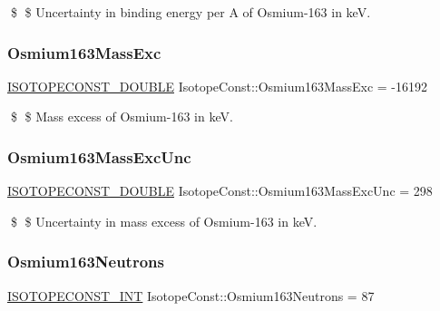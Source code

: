 \$ \$ Uncertainty in binding energy per A of Osmium-\/163 in keV. \mbox{\label{group___isotope_const-_osmium-_os163_ga13b33f42e049f05ee7041526cd588dcc}} 
\subsubsection{\texorpdfstring{Osmium163\+Mass\+Exc}{Osmium163MassExc}}
{\footnotesize\ttfamily \mbox{\hyperlink{group___isotope_const-_macros_ga8f45a7272ce02c0b4c65c44636ed719a}{I\+S\+O\+T\+O\+P\+E\+C\+O\+N\+S\+T\+\_\+\+D\+O\+U\+B\+LE}} Isotope\+Const\+::\+Osmium163\+Mass\+Exc = -\/16192}

\$ \$ Mass excess of Osmium-\/163 in keV. \mbox{\label{group___isotope_const-_osmium-_os163_gaa118f68becfa0de133e3e733c71ae832}} 
\subsubsection{\texorpdfstring{Osmium163\+Mass\+Exc\+Unc}{Osmium163MassExcUnc}}
{\footnotesize\ttfamily \mbox{\hyperlink{group___isotope_const-_macros_ga8f45a7272ce02c0b4c65c44636ed719a}{I\+S\+O\+T\+O\+P\+E\+C\+O\+N\+S\+T\+\_\+\+D\+O\+U\+B\+LE}} Isotope\+Const\+::\+Osmium163\+Mass\+Exc\+Unc = 298}

\$ \$ Uncertainty in mass excess of Osmium-\/163 in keV. \mbox{\label{group___isotope_const-_osmium-_os163_ga75f1658134a2aa3621d6da50d4b6484e}} 
\subsubsection{\texorpdfstring{Osmium163\+Neutrons}{Osmium163Neutrons}}
{\footnotesize\ttfamily \mbox{\hyperlink{group___isotope_const-_macros_ga5f18360b3e99483a35c32d789e62621c}{I\+S\+O\+T\+O\+P\+E\+C\+O\+N\+S\+T\+\_\+\+I\+NT}} Isotope\+Const\+::\+Osmium163\+Neutrons = 87}

